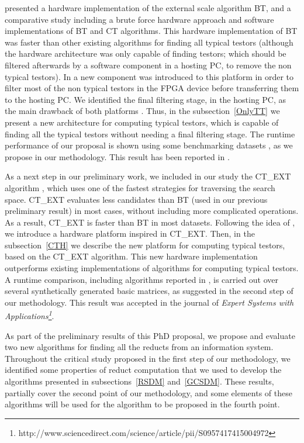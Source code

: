 \documentclass[authoryear,11pt]{elsarticle}
\begin{document}
	\cite{Rojas07} presented a hardware implementation of the external scale algorithm BT, and a 
	comparative study including a brute force hardware approach and software implementations of BT and 
	CT \citep{Bravo83} algorithms. 
	This hardware implementation of BT was faster than other existing algorithms for finding all
	typical	testors (although the hardware architecture was only capable of finding testors; which should 
	be filtered afterwards by a software component in a hosting PC, to remove the non typical testors). 
	In \citep{Rojas12} a new component was introduced to this platform in order to filter most of the non 
	typical testors in the FPGA device before transferring them to the hosting PC. We identified the final
	filtering stage, in the hosting PC, as the main drawback of both platforms \citep{Rojas07,Rojas12}.
	Thus, in the subsection~\ref{OnlyTT} we present a new architecture for computing typical testors, which 
	is capable of finding all the typical testors without needing a final filtering stage. 
	The runtime performance of our proposal is shown using some benchmarking datasets \citep{Bache13}, as 
	we propose in our methodology.
	This result has been reported in \citep{Rodriguez14}. 
	
	As a next step in our preliminary work, we included in our study the CT\_EXT algorithm \citep{Sanchez07},
	which uses one of the fastest strategies for traversing the search space.
	CT\_EXT evaluates less candidates than BT (used in our previous preliminary result) in most cases, without 
	including more complicated operations.
	As a result, CT\_EXT is faster than BT in most datasets. Following the idea of \cite{Rojas07}, we introduce
	a hardware platform inspired in CT\_EXT.
	Then, in the subsection~\ref{CTH} we describe the new platform for computing typical testors, based on the 
	CT\_EXT algorithm. This new hardware implementation outperforms existing implementations of algorithms 
	for computing typical testors. A runtime comparison, including algorithms reported in 
	\citep{Rodriguez14,Sanchez07}, is carried out over several synthetically generated basic matrices, as 
	suggested in the second step of our methodology.
	This result was accepted in the journal of \emph{Expert Systems with 
	Applications\footnote{http://www.sciencedirect.com/science/article/pii/S0957417415004972}}.
	
	As part of the preliminary results of this PhD proposal,  we propose and evaluate two new algorithms for 
	finding all the reducts from an information system. Throughout the critical study proposed in the first step 
	of our methodology, we identified some properties of reduct computation that we used to develop the algorithms 
	presented in subsections~\ref{RSDM} and~\ref{GCSDM}. These results, partially cover the second point of our
	methodology, and some elements of these algorithms will be used for the algorithm to be proposed in the
	fourth point. 
	
\end{document}
